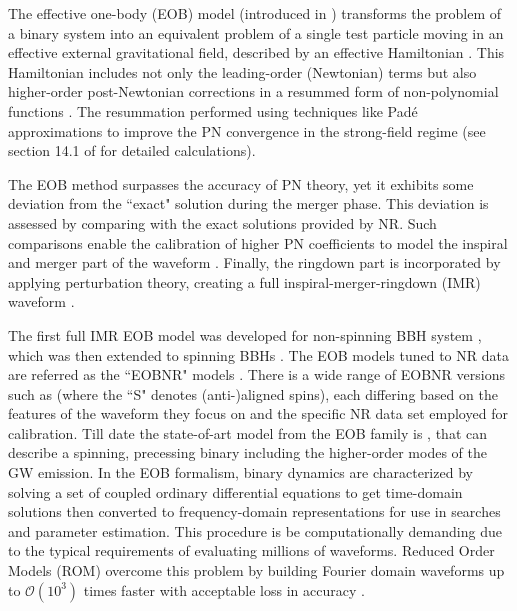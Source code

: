 The effective one-body (EOB) model (introduced in \cite{Buonanno:1998gg}) transforms the problem of a binary system into an equivalent problem of a single test particle moving in an effective external gravitational field, described by an effective Hamiltonian \cite{Buonanno:1998gg,Buonanno:2000ef,Damour:2000we,Damour:2001tu}. This Hamiltonian includes not only the leading-order (Newtonian) terms but also higher-order post-Newtonian corrections in a resummed form of non-polynomial functions \cite{Damour:2008te}. The resummation  performed using techniques like Padé approximations to improve the PN convergence in the strong-field regime (see section 14.1 of \cite{Maggiore:2018aab} for detailed calculations). 

The EOB method surpasses the accuracy of PN theory, yet it exhibits some deviation from the ``exact" solution during the merger phase. This deviation is assessed by comparing with the exact solutions provided by NR. Such comparisons enable the calibration of higher PN coefficients to model the inspiral and merger part of the waveform \cite{Buonanno:2007pf}. Finally, the ringdown part is incorporated by applying perturbation theory, creating a full inspiral-merger-ringdown (IMR) waveform \cite{Damour:2007xr}.

The first full IMR EOB model was developed for non-spinning BBH system \cite{Buonanno:2000ef}, which was then extended to spinning BBHs \cite{Buonanno:2000ef}. The EOB models tuned to NR data are referred as the ``EOBNR" models \cite{Buonanno:2007pf}. There is a wide range of EOBNR versions such as  \cite{Taracchini:2012ig} (where the ``S" denotes (anti-)aligned spins), each differing based on the features of the waveform they focus on and the specific NR data set employed for calibration. Till date the state-of-art model from the EOB family is  \cite{Ramos-Buades:2023ehm,Pompili:2023tna}, that can describe a spinning, precessing binary including the higher-order modes of the GW emission. In the EOB formalism, binary dynamics are characterized by solving a set of coupled ordinary differential equations to get time-domain solutions then converted to frequency-domain representations for use in searches and parameter estimation. This procedure is be computationally demanding due to the typical requirements of evaluating millions of waveforms. Reduced Order Models (ROM) overcome this problem by building Fourier domain waveforms up to $\mathcal{O}(10^3)$ times faster with acceptable loss in accuracy \cite{Purrer:2015tud}.   


